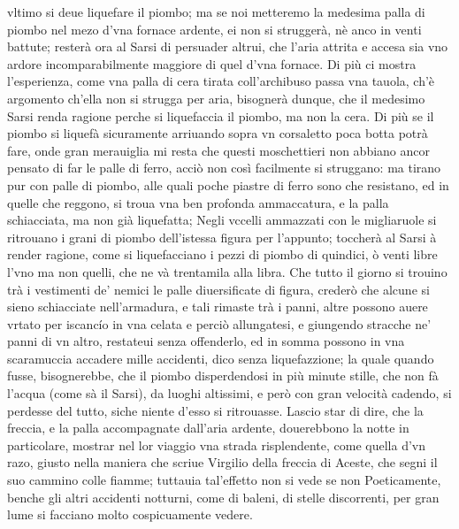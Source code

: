 \documentclass[11pt,twoside,openany]{book}
\begin{document}
vltimo si deue liquefare il piombo; ma se noi metteremo la medesima palla di piombo nel mezo d'vna fornace ardente, ei non si struggerà, nè anco in venti battute; resterà ora al Sarsi di persuader altrui, che l'aria attrita e accesa sia vno ardore incomparabilmente maggiore di quel d'vna fornace. Di più ci mostra l'esperienza, come vna palla di cera tirata coll'archibuso passa vna tauola, ch'è argomento ch'ella non si strugga per aria, bisognerà dunque, che il medesimo Sarsi renda ragione perche si liquefaccia il piombo, ma non la cera. Di più se il piombo si liquefà sicuramente arriuando sopra vn corsaletto poca botta potrà fare, onde gran merauiglia mi resta che questi moschettieri non abbiano ancor pensato di far le palle di ferro, acciò non così facilmente si struggano: ma tirano pur con palle di piombo, alle quali poche piastre di ferro sono che resistano, ed in quelle che reggono, si troua vna ben profonda ammaccatura, e la palla schiacciata, ma non già liquefatta; Negli vccelli ammazzati con le migliaruole si ritrouano i grani di piombo dell'istessa figura per l'appunto; toccherà al Sarsi à render ragione, come si liquefacciano i pezzi di piombo di quindici, ò venti libre l'vno ma non quelli, che ne và trentamila alla libra. Che tutto il giorno si trouino trà i vestimenti de' nemici le palle diuersificate di figura, crederò che alcune si sieno schiacciate nell'armadura, e tali rimaste trà i panni, altre possono auere vrtato per iscancío in vna celata e perciò allungatesi, e giungendo stracche ne' panni di vn altro, restateui senza offenderlo, ed in somma possono in vna scaramuccia accadere mille accidenti, dico senza liquefazzione; la quale quando fusse, bisognerebbe, che il piombo disperdendosi in più minute stille, che non fà l'acqua (come sà il Sarsi), da luoghi altissimi, e però con gran velocità cadendo, si perdesse del tutto, siche niente d'esso si ritrouasse. Lascio star di dire, che la freccia, e la palla accompagnate dall'aria ardente, douerebbono la notte in particolare, mostrar nel lor viaggio vna strada risplendente, come quella d'vn razo, giusto nella maniera che scriue Virgilio della freccia di Aceste, che segni il suo cammino colle fiamme; tuttauia tal'effetto non si vede se non Poeticamente, benche gli altri accidenti notturni, come di baleni, di stelle discorrenti, per gran lume si facciano molto cospicuamente vedere.
\end{document}
